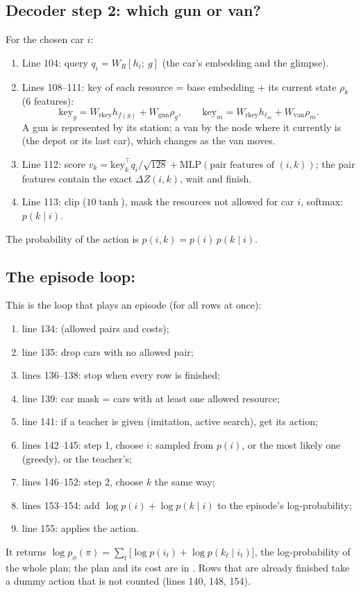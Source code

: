 \subsection{Decoder step 2: which gun or van?}


For the chosen car $i$:
\begin{enumerate}
  \item Line 104: query $q_i=W_R[h_i;\ g]$ (the car's embedding and the glimpse).
  \item Lines 108--111: key of each resource = base embedding + its current state $\rho_k$ (6 features):
  \[
  \text{key}_g=W_{\text{rkey}}h_{f(g)}+W_{\text{gun}}\rho_g,\qquad \text{key}_m=W_{\text{rkey}}h_{\ell_m}+W_{\text{van}}\rho_m .
  \]
  A gun is represented by its station; a van by the node where it currently is (the depot or its last car), which changes as the van moves.
  \item Line 112: score $v_k=\text{key}_k^\top q_i/\sqrt{128}+\mathrm{MLP}(\text{pair features of }(i,k))$; the pair features contain the exact $\Delta Z(i,k)$, wait and finish.
  \item Line 113: clip ($10\tanh$), mask the resources not allowed for car $i$, softmax: $p(k\mid i)$.
\end{enumerate}

The probability of the action is $p(i,k)=p(i)\,p(k\mid i)$.

\subsection{The episode loop: }


This is the loop that plays an episode (for all rows at once):
\begin{enumerate}
  \item line 134:  (allowed pairs and costs);
  \item line 135: drop cars with no allowed pair;
  \item lines 136--138: stop when every row is finished;
  \item line 139: car mask = cars with at least one allowed resource;
  \item line 141: if a teacher is given (imitation, active search), get its action;
  \item lines 142--145: step 1, choose $i$: sampled from $p(i)$, or the most likely one (greedy), or the teacher's;
  \item lines 146--152: step 2, choose $k$ the same way;
  \item lines 153--154: add $\log p(i)+\log p(k\mid i)$ to the episode's log-probability;
  \item line 155:  applies the action.
\end{enumerate}
It returns $\log p_\phi(\pi)=\sum_t\big[\log p(i_t)+\log p(k_t\mid i_t)\big]$, the log-probability of the whole plan; the plan and its cost are in . Rows that are already finished take a dummy action that is not counted (lines 140, 148, 154).

